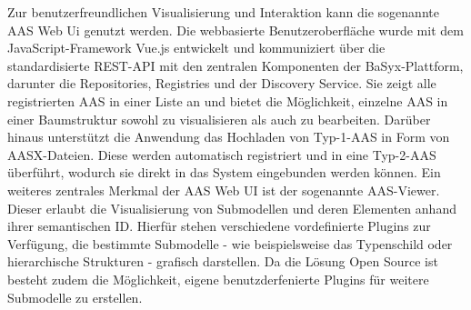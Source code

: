 Zur benutzerfreundlichen Visualisierung und Interaktion kann die sogenannte AAS Web Ui genutzt werden.
Die webbasierte Benutzeroberfläche wurde mit dem JavaScript-Framework Vue.js entwickelt und kommuniziert über die standardisierte REST-API mit den zentralen Komponenten der BaSyx-Plattform, darunter die Repositories, Registries und der Discovery Service.
Sie zeigt alle registrierten AAS in einer Liste an und bietet die Möglichkeit, einzelne AAS in einer Baumstruktur sowohl zu visualisieren als auch zu bearbeiten. 
Darüber hinaus unterstützt die Anwendung das Hochladen von Typ-1-AAS in Form von AASX-Dateien. Diese werden automatisch registriert und in eine Typ-2-AAS überführt, wodurch sie direkt in das System eingebunden werden können.
Ein weiteres zentrales Merkmal der AAS Web UI ist der sogenannte AAS-Viewer.
Dieser erlaubt die Visualisierung von Submodellen und deren Elementen anhand ihrer semantischen ID. 
Hierfür stehen verschiedene vordefinierte Plugins zur Verfügung, die bestimmte Submodelle - wie beispielsweise das Typenschild oder hierarchische Strukturen - grafisch darstellen.
Da die Lösung Open Source ist besteht zudem die Möglichkeit, eigene benutzderfenierte Plugins für weitere Submodelle zu erstellen. \cite{BaSyxWiki} \cite{BaSyxEclipse}